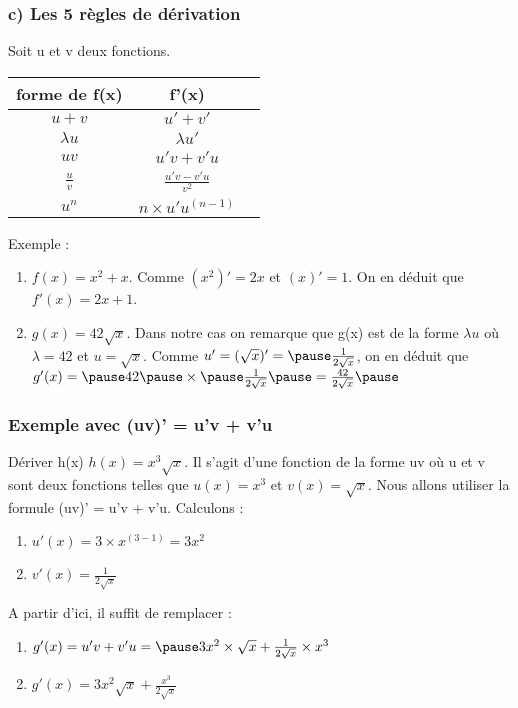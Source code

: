 \documentclass[t]{beamer}
\begin{document}
\begin{frame}[label=pagebanale]
\frametitle{c) Les 5 règles de dérivation}
\pause
Soit u et v deux fonctions.
\begin{tabular}{|c|c|c|}
	\hline
		\textbf{forme de f(x)} & \textbf{f'(x)} \\
	\hline
		$u+v$ & $u' + v'$ \\
	\hline
		$\lambda u$ & $\lambda u'$ \\
	\hline
		$uv $ & $u'v +v'u$ \\
	\hline 
		$\frac{u}{v}$ & $\frac{u'v-v'u}{v^2}$ \\
	\hline
		$u^n$ & $n \times u' u^{(n-1)}$ \\
	\hline
\end{tabular}
\begin{block}{Exemple :}
	\begin{enumerate}
		\item<+-> $f(x) = x^2 + x$. \pause Comme $(x^2)' = 2x$ \pause et $(x)' = 1$. \pause On en déduit que $f'(x) = 2x + 1$. \pause
		\item<+-> $g(x) = 42 \sqrt{x}$. \pause Dans notre cas on remarque que g(x) est de la forme $\lambda u$ \pause où $\lambda = 42$ \pause et $u = \sqrt{x}$. \pause Comme $u' = (\sqrt{x})' = \pause \frac{1}{2\sqrt{x}}$, \pause on en déduit que $g'(x) = \pause 42 \pause \times \pause \frac{1}{2\sqrt{x}} \pause = \frac{42}{2\sqrt{x}} \pause $
	\end{enumerate}
\end{block}
\end{frame}

\begin{frame}
\frametitle{Exemple avec (uv)' = u'v + v'u}
\pause
\begin{block}{Dériver h(x)}
	$h(x) = x^3 \sqrt{x}$. \pause Il s'agit d'une fonction de la forme uv \pause où u et v sont deux fonctions \pause telles que $u(x) = x^3$ \pause et $v(x) = \sqrt{x}$. \pause Nous allons utiliser la formule (uv)' = u'v + v'u. \pause Calculons :
	\begin{enumerate}{}
		\item<+-> \(u'(x)= 3 \times x^{(3-1)} = 3x^2 \)
		\item<+-> \(v'(x) = \frac{1}{2 \sqrt{x}} \) 
	\end{enumerate}
	\pause
	A partir d'ici, il suffit de remplacer : \pause
	\begin{enumerate}[]
	\item<+-> \(g'(x) = u'v + v'u = \pause 3x^2 \times \sqrt{x} + \frac{1}{2 \sqrt{x}} \times x^3\) \pause
	\item<+-> \(g'(x) = 3x^2 \sqrt{x} + \frac{x^3}{2 \sqrt{x}} \)
	\end{enumerate}	
\end{block}
\end{frame}
\end{document}
